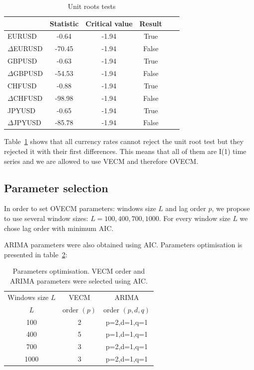 \begin{table}[h!]
\caption{Unit roots tests}
\label{tab:52adf}
\begin{center}
\begin{tabular}{|l|c|c|c|c|c|}
\hline
& \textbf{Statistic} & \textbf{Critical value} & \textbf{Result}\\
\hline
EURUSD          & -0.64 & -1.94 & True       \\
$\Delta$EURUSD & -70.45   & -1.94 & False       \\
GBPUSD          & -0.63   & -1.94 & True          \\
$\Delta$GBPUSD & -54.53   & -1.94 & False       \\
CHFUSD          & -0.88   & -1.94 & True         \\
$\Delta$CHFUSD & -98.98   & -1.94 & False       \\
JPYUSD          & -0.65 & -1.94 & True        \\
$\Delta$JPYUSD & -85.78 & -1.94 & False     \\ 
\hline
\end{tabular}
\end{center}
\end{table}


Table~\ref{tab:52adf} shows that all currency rates cannot reject the unit root
test but they rejected it with their first differences. This means that all of
them are I(1) time series and we are allowed to use VECM and therefore OVECM.


\subsection{Parameter selection} \label{sec:paramselection}

In order to set OVECM parameters: windows size $L$ and lag order $p$,
we propose to use several window sizes: $L = 100, 400, 700, 1000$. For every window size $L$ we chose lag order with minimum AIC.

ARIMA parameters were also obtained using AIC.
Parameters optimisation is presented in table~\ref{tab:52params}:

\begin{table}[ht]
\caption{Parameters optimisation. VECM order and ARIMA parameters were selected
using AIC.}
\label{tab:52params}
\begin{center}
\begin{tabular}{|c|c|c|}
\hline
Windows size $L$ & VECM & ARIMA\\
 $L$ & order $(p)$ & order $(p,d,q)$ \\
\hline
100 & 2 & p=2,d=1,q=1\\
400 & 5 & p=1,d=1,q=1\\
700 & 3 &p=2,d=1,q=1\\
1000 &3 & p=2,d=1,q=1\\
\hline
\end{tabular}
\end{center}
\end{table}

